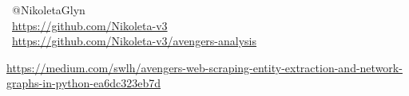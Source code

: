 \documentclass{beamer}
\begin{document}
\begin{frame}
    \begin{center}
        \small
    \faTwitter \ @NikoletaGlyn \\
    \faGithub \ \url{https://github.com/Nikoleta-v3} \\
    \faGithub \ \url{https://github.com/Nikoleta-v3/avengers-analysis} \\ \vspace{1cm}



    \tiny{\url{https://medium.com/swlh/avengers-web-scraping-entity-extraction-and-network-graphs-in-python-ea6dc323eb7d}}
    \end{center}
\end{frame}
\end{document}
